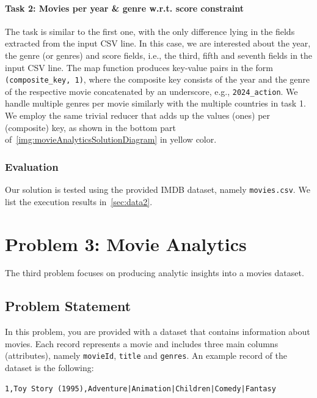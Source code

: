 \documentclass[acmlarge]{acmart}
\begin{document}
\paragraph{Task 2: Movies per year \& genre w.r.t. score constraint} The task is similar to the first one, with the only difference lying in the fields extracted from the input CSV line. In this case, we are interested about the year, the genre (or genres) and score fields, i.e., the third, fifth and seventh fields in the input CSV line. The map function produces key-value pairs in the form \texttt{(composite\_key, 1)}, where the composite key consists of the year and the genre of the respective movie concatenated by an underscore, e.g., \texttt{2024\_action}. We handle multiple genres per movie similarly with the multiple countries in task 1. We employ the same trivial reducer that adds up the values (ones) per (composite) key, as shown in the bottom part of~\autoref{img:movieAnalyticsSolutionDiagram} in yellow color.

\subsubsection{Evaluation} Our solution is tested using the provided IMDB dataset, namely \texttt{movies.csv}. We list the execution results in~\autoref{sec:data2}.

\section{Problem 3: Movie Analytics}
\label{sec:problem3}
The third problem focuses on producing analytic insights into a movies dataset.


\subsection{Problem Statement}
In this problem, you are provided with a dataset that contains information about movies. Each record represents a movie and includes three main columns (attributes), namely \texttt{movieId}, \texttt{title} and \texttt{genres}. An example record of the dataset is the following:

\begin{verbatim}
1,Toy Story (1995),Adventure|Animation|Children|Comedy|Fantasy
\end{verbatim}
\end{document}

